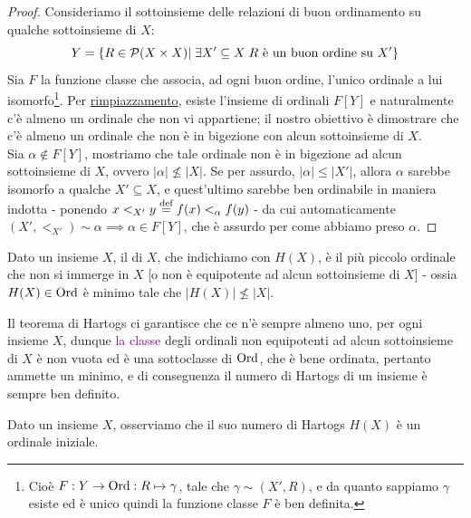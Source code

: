 \begin{proof}
	Consideriamo il sottoinsieme delle relazioni di buon ordinamento su qualche sottoinsieme di $X$:
	\[ Y = \{R \in \mathcal{P}(X \times X) |\; \exists X' \subseteq X \; \text{$R$ è un buon ordine su $X'$}\}
		\]
	Sia $F$ la funzione classe che associa, ad ogni buon ordine, l'unico ordinale a lui isomorfo\footnote{Cioè $F : Y \rightarrow \operatorname{Ord} : R \mapsto \gamma$, tale che $\gamma \sim (X',R)$, e da quanto sappiamo $\gamma$ esiste ed è unico quindi la funzione classe $F$ è ben definita.}.
	Per \hyperref[ax8]{rimpiazzamento}, esiste l'insieme di ordinali $F[Y]$ e naturalmente c'è almeno un ordinale che non vi appartiene; il nostro obiettivo è dimostrare che c'è almeno un ordinale che non è in bigezione con alcun sottoinsieme di $X$.\\
	Sia $\alpha \not \in F[Y]$, mostriamo che tale ordinale non è in bigezione ad alcun sottoinsieme di $X$, ovvero $|\alpha| \not\leq |X|$. Se per assurdo, $|\alpha| \leq |X'|$, allora $\alpha$ sarebbe isomorfo a qualche $X' \subseteq X$, e quest'ultimo sarebbe ben ordinabile in maniera indotta -
	ponendo $x <_{X'} y \overset{\text{def}}{=} f(x) <_\alpha f(y)$ - da cui automaticamente $(X',<_{X'}) \sim \alpha \implies \alpha \in F[Y]$, che è assurdo per come abbiamo preso $\alpha$.
\end{proof}

\begin{definition}
	Dato un insieme $X$, il  di $X$, che indichiamo con $H(X)$, è il più piccolo ordinale che non si immerge in $X$ [o non è equipotente ad alcun sottoinsieme di $X$] - ossia $H(X) \in \operatorname{Ord}$ è minimo tale che $|H(X)| \not\leq |X|$.
\end{definition}

\begin{remark}
	Il teorema di Hartogs ci garantisce che ce n'è sempre almeno uno, per ogni insieme $X$, dunque \textcolor{purple}{la classe} degli ordinali non equipotenti ad alcun sottoinsieme di $X$ è non vuota ed è una sottoclasse di $\operatorname{Ord}$, che è bene ordinata,
	pertanto ammette un minimo, e di conseguenza il numero di Hartogs di un insieme è sempre ben definito.
\end{remark}

\begin{remark}
	Dato un insieme $X$, osserviamo che il suo numero di Hartogs $H(X)$ è un ordinale iniziale.
\end{remark}


